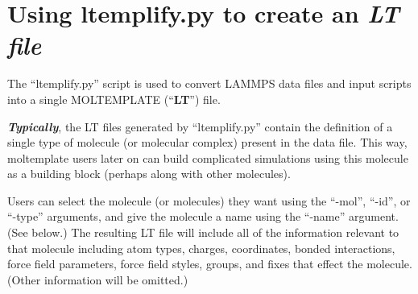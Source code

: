 \documentclass[11pt]{article}
\begin{document}






\section{Using ltemplify.py to create an \textit{LT file}}
\label{sec:ltemplify}

The ``ltemplify.py'' script is used to convert LAMMPS data files and
input scripts into a single MOLTEMPLATE (``\textbf{LT}'') file.

\textbf{\textit{Typically}}, the LT files generated
by ``ltemplify.py'' contain the definition of a single type of molecule
(or molecular complex) present in the data file.
This way, moltemplate users later on can build complicated simulations using
this molecule as a building block (perhaps along with other molecules).

Users can select the molecule (or molecules) they want
using the ``-mol'', ``-id'', or ``-type'' arguments,
and give the molecule a name using the ``-name'' argument.  (See below.)
The resulting LT file will include all of the information relevant
to that molecule including atom types, charges, coordinates,
bonded interactions, force field parameters, force field styles,
groups, and fixes that effect the molecule.
(Other information will be omitted.)
\end{document}
